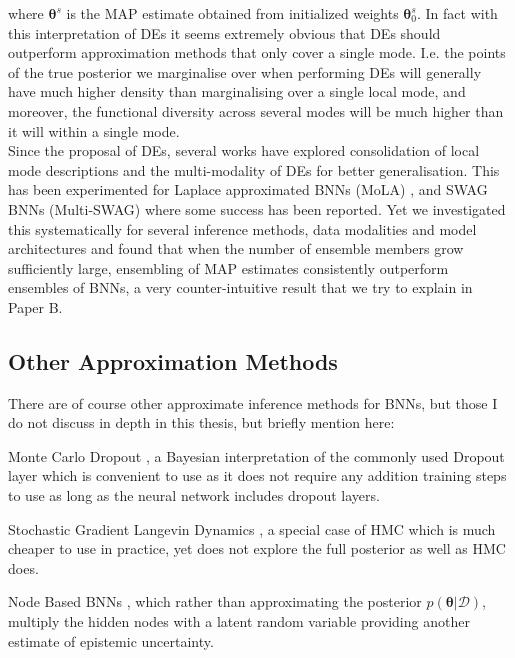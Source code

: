 \noindent where $\bm{\theta}^s$ is the MAP estimate obtained from initialized weights $\bm{\theta}_0^s$. In fact with this interpretation of DEs it seems extremely obvious that DEs should outperform approximation methods that only cover a single mode. I.e. the points of the true posterior we marginalise over when performing DEs will generally have much higher density than marginalising over a single local mode, and moreover, the functional diversity across several modes will be much higher than it will within a single mode. \\

\noindent Since the proposal of DEs, several works have explored consolidation of local mode descriptions and the multi-modality of DEs for better generalisation. This has been experimented for Laplace approximated BNNs (MoLA) \citep{2021_MOLA}, and SWAG BNNs (Multi-SWAG) \citep{2020_MultiSWAG} where some success has been reported. Yet we investigated this systematically for several inference methods, data modalities and model architectures and found that when the number of ensemble members grow sufficiently large, ensembling of MAP estimates consistently outperform ensembles of BNNs, a very counter-intuitive result that we try to explain in Paper B.


\subsection{Other Approximation Methods}

\noindent There are of course other approximate inference methods for BNNs, but those  I do not discuss in depth in this thesis, but briefly mention here:  \begin{enumerate*}
\item Monte Carlo Dropout \citep{mcdropout_2016}, a Bayesian interpretation of the commonly used Dropout layer \citep{2014_Dropout} which is convenient to use as it does not require any addition training steps to use as long as the neural network includes dropout layers.
\item Stochastic Gradient Langevin Dynamics \citep{SGLD_2011}, a special case of HMC which is much cheaper to use in practice, yet does not explore the full posterior as well as HMC does.
\item Node Based BNNs \citep{Rank1BNN_2020}, which rather than approximating the posterior $p(\bm{\theta}|\mathcal{D})$, multiply the hidden nodes with a latent random variable providing another estimate of epistemic uncertainty.
\end{enumerate*}

